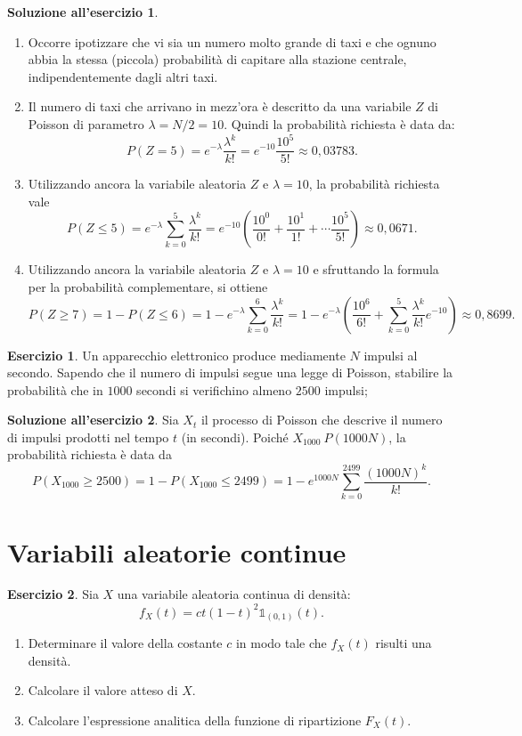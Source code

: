 \documentclass[12pt,a4paper]{article}
\theoremstyle{definition}
\newtheorem{sol}{Soluzione all'esercizio}
\newtheorem{exe}{Esercizio}
\begin{document}
\begin{sol}
	\begin{enumerate}
		\item Occorre ipotizzare che vi sia un numero molto grande di taxi e che ognuno abbia la stessa (piccola) probabilità di capitare alla stazione centrale, indipendentemente dagli altri taxi.
		\item Il numero di taxi che arrivano in mezz'ora è descritto da una variabile $ Z $ di Poisson di parametro $ \lambda = N/2 = 10 $. Quindi la probabilità richiesta è data da:
		      \[ P(Z = 5) = e^{-\lambda} \frac{\lambda^{k}}{k!} = e^{-10}\frac{10^{5}}{5!} \approx 0,03783. \]
		\item Utilizzando ancora la variabile aleatoria $ Z $ e $ \lambda = 10 $, la probabilità richiesta vale
		      \[ P(Z \le 5) = e^{-\lambda} \sum_{k=0}^{5}\frac{\lambda^{k}}{k!} = e^{-10}\left( \frac{10^{0}}{0!} + \frac{10^{1}}{1!} + \cdots \frac{10^{5}}{5!}\right) \approx 0,0671. \]
		\item Utilizzando ancora la variabile aleatoria $ Z $ e $ \lambda = 10 $ e sfruttando la formula per la probabilità complementare, si ottiene
		      \[ P(Z \ge 7) = 1 - P(Z \le 6) = 1 - e^{-\lambda} \sum_{k=0}^{6}\frac{\lambda^{k}}{k!} = 1 - e^{-\lambda} \left(\frac{10^{6}}{6!} + \sum_{k=0}^{5}\frac{\lambda^{k}}{k!} e^{-10} \right) \approx 0,8699. \]
	\end{enumerate}
\end{sol}

\begin{exe}
	Un apparecchio elettronico produce mediamente $ N $ impulsi al secondo. Sapendo che il numero di impulsi segue una legge di Poisson, stabilire la probabilità che in $ 1000 $ secondi si verifichino almeno $ 2500 $ impulsi;
\end{exe}

\begin{sol}
	Sia $ X_t $ il processo di Poisson che descrive il numero di impulsi prodotti nel tempo $ t $ (in secondi). Poiché $ X_{1000} ~ P(1000 N) $, la probabilità richiesta è data da
	\[ P(X_{1000} \ge 2500) = 1 - P(X_{1000} \le 2499) = 1 - e^{1000 N}\sum_{k=0}^{2499}\frac{(1000N)^k}{k!}. \]
\end{sol}

\section{Variabili aleatorie continue}

\begin{exe}
	Sia $ X $ una variabile aleatoria continua di densità:
	\[ f_{X}(t) = ct(1-t)^2 \mathds{1}_{(0,1)}(t).\]
	\begin{enumerate}
		\item Determinare il valore della costante $ c $ in modo tale che $ f_{X}(t) $ risulti una densità.
		\item Calcolare il valore atteso di $ X $.
		\item Calcolare l'espressione analitica della funzione di ripartizione $ F_{X}(t) $.
	\end{enumerate}
\end{exe}
\end{document}
